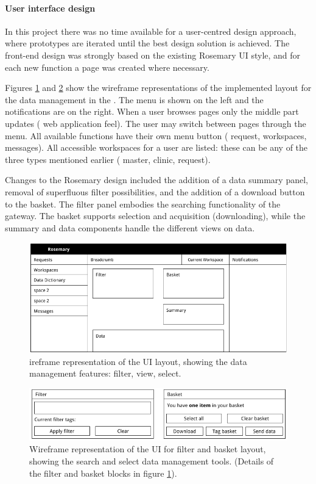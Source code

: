 \paragraph{User interface design}
In this project there was no time available for a user-centred design approach, where prototypes are iterated until the best design solution is achieved.
The front-end design was strongly based on the existing Rosemary UI style, and for each new function a page was created where necessary.

Figures \ref{fig:wireframe-layout} and \ref{fig:wireframe-basket-layout} show the wireframe representations of the implemented layout for the data management in the \ivfprototype{}.
The menu is shown on the left and the notifications are on the right. 
When a user browses pages only the middle part updates (\ie{} web application feel).
The user may switch between pages through the menu. 
All available functions have their own menu button (\eg{} request, workspaces, messages).
All accessible workspaces for a user are listed: these can be any of the three types mentioned earlier (\ie{} master, clinic, request).

Changes to the Rosemary design included the addition of a data summary panel, removal of superfluous filter possibilities, and the addition of a download button to the basket.
The filter panel embodies the searching functionality of the gateway.
The basket supports selection and acquisition (downloading), while the summary and data components handle the different views on data.

\begin{figure}[hb]
	\centering
	\includegraphics[width=1.0\linewidth]{images/evaluation-layout}
	\caption{
		ireframe representation of the UI layout, showing the data management features: filter, view, select.
	}
	\label{fig:wireframe-layout}
\end{figure}

\begin{figure}[hb]
	\centering
	\includegraphics[width=1.0\linewidth]{images/evaluation-basket-layout}
	\caption{
		Wireframe representation of the UI for filter and basket layout, showing the search and select data management tools.
		(Details of the filter and basket blocks in figure \ref{fig:wireframe-layout}).
	}
	\label{fig:wireframe-basket-layout}
\end{figure}
